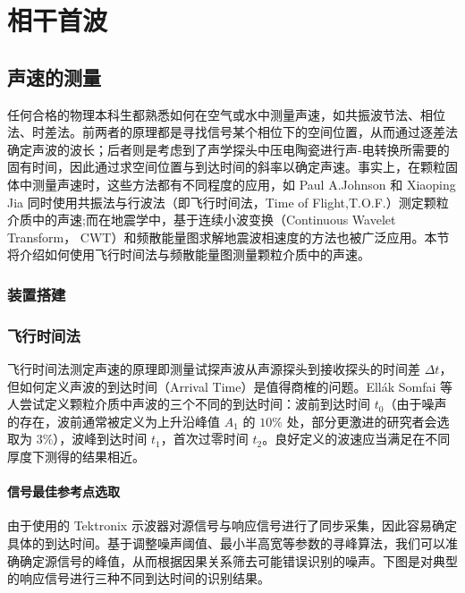
\chapter{相干首波}

\section{声速的测量}

任何合格的物理本科生都熟悉如何在空气或水中测量声速，如共振波节法、相位法、时差法。前两者的原理都是寻找信号某个相位下的空间位置，从而通过逐差法确定声波的波长；后者则是考虑到了声学探头中压电陶瓷进行声-电转换所需要的固有时间，因此通过求空间位置与到达时间的斜率以确定声速。事实上，在颗粒固体中测量声速时，这些方法都有不同程度的应用，如 Paul A.Johnson 和 Xiaoping Jia 同时使用共振法与行波法（即飞行时间法，Time of Flight,T.O.F.）测定颗粒介质中的声速\cite{Johnson_2005};而在地震学中，基于连续小波变换（Continuous Wavelet Transform， CWT）和频散能量图求解地震波相速度的方法也被广泛应用。本节将介绍如何使用飞行时间法与频散能量图测量颗粒介质中的声速。

\subsection{装置搭建}



\subsection{飞行时间法}

飞行时间法测定声速的原理即测量试探声波从声源探头到接收探头的时间差 $\Delta t$，但如何定义声波的到达时间（Arrival Time）是值得商榷的问题。Ellák Somfai 等人尝试定义颗粒介质中声波的三个不同的到达时间：波前到达时间 $t_{0}$（由于噪声的存在，波前通常被定义为上升沿峰值 $A_{1}$ 的 $\num{10}\%$ 处，部分更激进的研究者会选取为 $3\%$），波峰到达时间 $t_{1}$，首次过零时间 $t_{2}$\cite{PhysRevE.72.021301}。良好定义的波速应当满足在不同厚度下测得的结果相近。

\subsubsection{信号最佳参考点选取}

由于使用的 Tektronix 示波器对源信号与响应信号进行了同步采集，因此容易确定具体的到达时间。基于调整噪声阈值、最小半高宽等参数的寻峰算法，我们可以准确确定源信号的峰值，从而根据因果关系筛去可能错误识别的噪声。下图是对典型的响应信号进行三种不同到达时间的识别结果。

